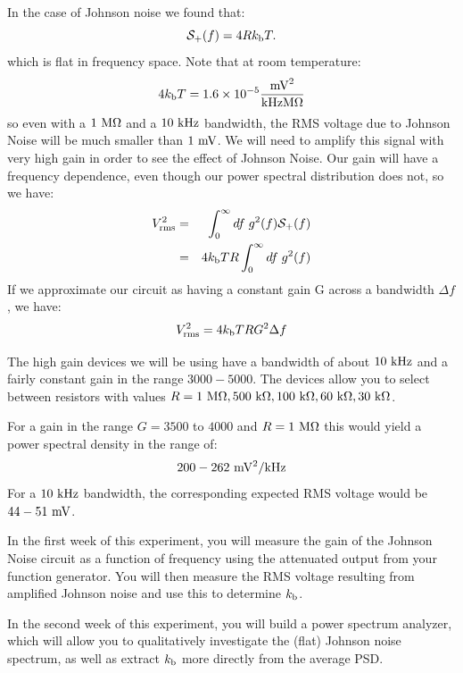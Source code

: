 \documentclass[12pt]{article}
\newcommand{\kb}{k_{\rm b}}
\begin{document}
In the case of Johnson noise we found that:
\begin{equation}
\mathcal{S}_{+}(f) = 4 R \kb T.
\end{equation}
which is flat in frequency space.  Note that at room temperature:
\begin{displaymath}
4 \kb T =  1.6 \times 10^{-5} \frac{{\rm mV}^2}{\rm kHz M\Omega}
\end{displaymath}
so even with a $1~\rm M\Omega$ and a $10~\rm kHz$ bandwidth, the RMS voltage due to Johnson Noise will be much smaller than $1~\rm mV$.  We will need to amplify this signal with very high gain in order to see the effect of Johnson Noise.  Our gain will have a frequency dependence, even though our power spectral distribution does not, so we have:
\begin{eqnarray*}
V_{\rm rms}^2  &=& \int_{0}^{\infty} df \; g^2(f) \mathcal{S}_+(f)\\
&=& 4 \kb T R \int_{0}^{\infty} df \; g^2(f)
\end{eqnarray*}
If we approximate our circuit as having a constant gain G across a bandwidth $\Delta f$, we have:
\begin{displaymath}
V_{\rm rms}^2  = 4 \kb T R G^2 \Delta f
\end{displaymath}

The high gain devices we will be using have a bandwidth of about $10~\rm kHz$ and a fairly constant gain in the range $3000-5000$.   The devices allow you to select between resistors with values $R=1~{\rm M\Omega}, 500~{\rm k\Omega}, 100~{\rm k\Omega}, 60~{\rm k\Omega}, 30~{\rm k\Omega}$.

For a gain in the range $G=3500$ to $4000$ and $R=1~\rm M\Omega$ this would yield a power spectral density in the range of:
\begin{displaymath}
200-262~\rm mV^2/kHz
\end{displaymath}
For a $10~\rm kHz$ bandwidth, the corresponding expected RMS voltage would be $44-51~\rm mV$.

In the first week of this experiment, you will measure the gain of the Johnson Noise circuit as a function of frequency using the attenuated output from your function generator.  You will then measure the RMS voltage resulting from amplified Johnson noise and use this to determine $\kb$.

In the second week of this experiment, you will build a power spectrum analyzer, which will allow you to qualitatively investigate the (flat) Johnson noise spectrum, as well as extract $\kb$ more directly from the average PSD.
\end{document}
